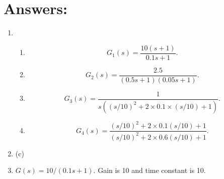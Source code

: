 \documentclass{article}
\newcommand{\tikzdir}[1]{tikz/#1.tikz}
\newcommand{\inputtikz}[1]{}}
\begin{document}
\section*{Answers:}
\begin{enumerate}
\item 
  \begin{enumerate}
  \item  \[G_1(s)=\frac{10(s+1)}{0.1s+1}.\]
  \begin{figure}[ht]
    \centering
    \inputtikz{Tut81a}
  \end{figure}
  \newpage
  \item  \[G_2(s)=\frac{2.5}{(0.5s+1)(0.05s+1)}.\]
  \begin{figure}[ht]
    \centering
    \inputtikz{Tut81b}
  \end{figure}
  \newpage
  \item  \[G_3(s) = \frac{1}{s((s/10)^2+2\times 0.1 \times (s/10)+1)}.\]
  \begin{figure}[ht]
    \centering
    \inputtikz{Tut81c}
  \end{figure}
  \newpage
  \item  \[G_4(s) = \frac{(s/10)^2+2\times 0.1(s/10)+1}{(s/10)^2+2\times 0.6(s/10)+1}.\] 
  \begin{figure}[ht]
    \centering
    \inputtikz{Tut81d}
  \end{figure}
  \end{enumerate}

\item (c)
\item $G(s) = 10/(0.1s+1)$. Gain is 10 and time constant is 10.
\end{enumerate}
\end{document}
